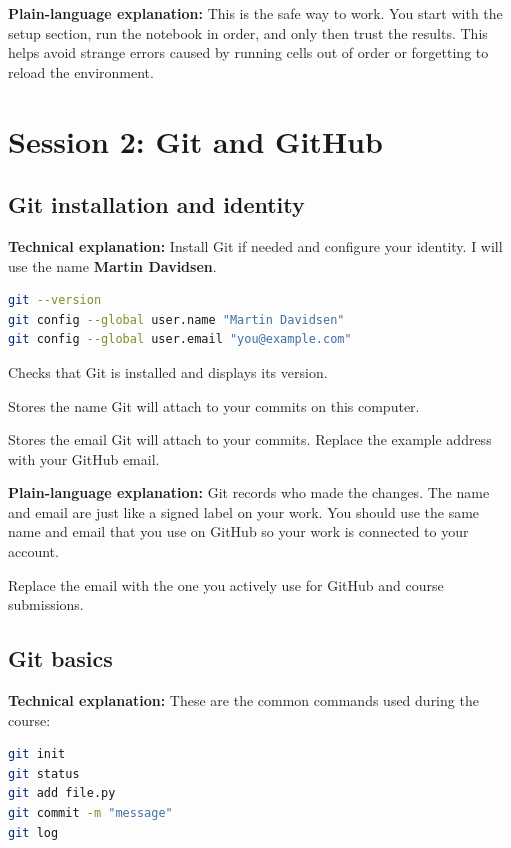 \documentclass[11pt,a4paper]{article}
\begin{document}
\textbf{Plain-language explanation:} This is the safe way to work. You start with the setup section, run the notebook in order, and only then trust the results. This helps avoid strange errors caused by running cells out of order or forgetting to reload the environment.

\section{Session 2: Git and GitHub}

\subsection{Git installation and identity}
\textbf{Technical explanation:} Install Git if needed and configure your identity. I will use the name \textbf{Martin Davidsen}.

\begin{lstlisting}[language=bash]
git --version
git config --global user.name "Martin Davidsen"
git config --global user.email "you@example.com"
\end{lstlisting}

\begin{description}[leftmargin=2.8cm,style=multiline]
    \item[\texttt{git --version}] Checks that Git is installed and displays its version.
    \item[\texttt{git config --global user.name}] Stores the name Git will attach to your commits on this computer.
    \item[\texttt{git config --global user.email}] Stores the email Git will attach to your commits. Replace the example address with your GitHub email.
\end{description}

\textbf{Plain-language explanation:} Git records who made the changes. The name and email are just like a signed label on your work. You should use the same name and email that you use on GitHub so your work is connected to your account.

Replace the email with the one you actively use for GitHub and course submissions.

\subsection{Git basics}
\textbf{Technical explanation:} These are the common commands used during the course:

\begin{lstlisting}[language=bash]
git init
git status
git add file.py
git commit -m "message"
git log
\end{lstlisting}
\end{document}
